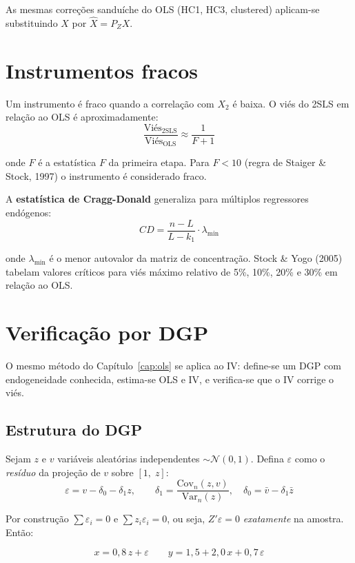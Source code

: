 As mesmas correções sanduíche do OLS (HC1, HC3, clustered) aplicam-se
substituindo $X$ por $\hat{X} = P_Z X$.

\section{Instrumentos fracos}

Um instrumento é fraco quando a correlação com $X_2$ é baixa. O viés do
2SLS em relação ao OLS é aproximadamente:
\[
  \frac{\mathrm{Viés}_{\mathrm{2SLS}}}{\mathrm{Viés}_{\mathrm{OLS}}}
  \approx \frac{1}{F + 1}
\]

onde $F$ é a estatística $F$ da primeira etapa. Para $F < 10$ (regra de
Staiger \& Stock, 1997) o instrumento é considerado fraco.

A \textbf{estatística de Cragg-Donald} generaliza para múltiplos
regressores endógenos:
\[
  CD = \frac{n - L}{L - k_1} \cdot \lambda_{\min}
\]

onde $\lambda_{\min}$ é o menor autovalor da matriz de concentração.
Stock \& Yogo (2005) tabelam valores críticos para viés máximo relativo
de 5\%, 10\%, 20\% e 30\% em relação ao OLS.

\section{Verificação por DGP}

O mesmo método do Capítulo~\ref{cap:ols} se aplica ao IV: define-se um DGP
com endogeneidade conhecida, estima-se OLS e IV, e verifica-se que o IV
corrige o viés.

\subsection*{Estrutura do DGP}

Sejam $z$ e $v$ variáveis aleatórias independentes $\sim \mathcal{N}(0,1)$.
Defina $\varepsilon$ como o \emph{resíduo} da projeção de $v$ sobre $[1,\;z]$:
\[
  \varepsilon = v - \delta_0 - \delta_1 z,
  \qquad
  \delta_1 = \frac{\mathrm{Cov}_n(z,v)}{\mathrm{Var}_n(z)},
  \quad
  \delta_0 = \bar v - \delta_1\bar z
\]

Por construção $\sum \varepsilon_i = 0$ e $\sum z_i\varepsilon_i = 0$, ou seja,
$Z'\varepsilon = 0$ \emph{exatamente} na amostra. Então:

\[
  x = 0{,}8\,z + \varepsilon
  \qquad
  y = 1{,}5 + 2{,}0\,x + 0{,}7\,\varepsilon
\]

